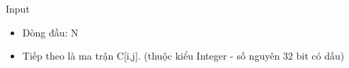 Input
\begin{itemize}
	\item Dòng đầu: N
	\item Tiếp theo là ma trận C[i,j]. (thuộc kiểu Integer - số nguyên 32 bit có dấu)
\end{itemize}
